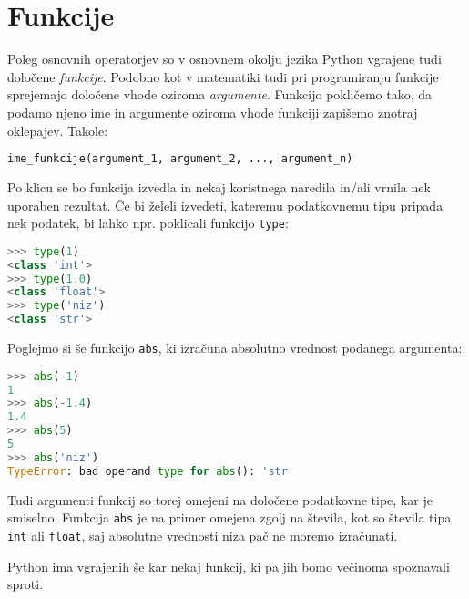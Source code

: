 \section{Funkcije}
Poleg osnovnih operatorjev so v osnovnem okolju jezika Python vgrajene tudi določene \emph{funkcije}. Podobno kot v matematiki tudi pri programiranju funkcije sprejemajo določene vhode oziroma \emph{argumente}. Funkcijo pokličemo tako, da podamo njeno ime in argumente oziroma vhode funkciji zapišemo znotraj oklepajev. Takole:
\begin{lstlisting}[language=Python]
ime_funkcije(argument_1, argument_2, ..., argument_n)
\end{lstlisting}
Po klicu se bo funkcija izvedla in nekaj koristnega naredila in/ali vrnila nek uporaben rezultat. Če bi želeli izvedeti, kateremu podatkovnemu tipu pripada nek podatek, bi lahko npr. poklicali funkcijo \texttt{type}:
\begin{lstlisting}[language=Python]
>>> type(1)
<class 'int'>
>>> type(1.0)
<class 'float'>
>>> type('niz')
<class 'str'>
\end{lstlisting}
Poglejmo si še funkcijo \texttt{abs}, ki izračuna absolutno vrednost podanega argumenta:
\begin{lstlisting}[language=Python]
>>> abs(-1)
1
>>> abs(-1.4)
1.4
>>> abs(5)
5
>>> abs('niz')
TypeError: bad operand type for abs(): 'str'
\end{lstlisting}
Tudi argumenti funkcij so torej omejeni na določene podatkovne tipe, kar je smiselno. Funkcija \texttt{abs} je na primer omejena zgolj na števila, kot so števila tipa \texttt{int} ali \texttt{float}, saj absolutne vrednosti niza pač ne moremo izračunati.

Python ima vgrajenih še kar nekaj funkcij, ki pa jih bomo večinoma spoznavali sproti. 

